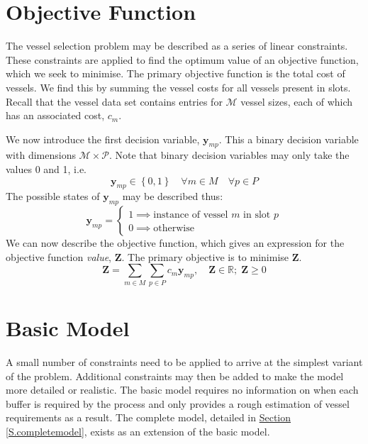 \section{Objective Function}\label{S.objfn}

The vessel selection problem may be described as a series of linear
constraints.
These constraints are applied to find the optimum value of an objective
function, which we seek to minimise.
The primary objective function is the total cost of vessels.
We find this by summing the vessel costs for all vessels present in slots.
Recall that the vessel data set contains entries for $\mathcal{M}$ vessel
sizes, each of which has an associated cost, $c_{m}$.

We now introduce the first decision variable, $\boldsymbol{y}_{mp}$.
This a binary decision variable with dimensions
$\mathcal{M} \times \mathcal{P}$.
Note that binary decision variables may only take the values 0 and 1, i.e.
\begin{equation}
    \boldsymbol{y}_{mp} \in \left\{ 0, 1 \right\} \quad \forall m \in M \quad
    \forall p \in P
    \label{eq.y}
\end{equation}
The possible states of $\boldsymbol{y}_{mp}$ may be described thus:
\begin{equation}
    \boldsymbol{y}_{mp} =
    \begin{cases}
        1 \implies \text{instance of vessel $m$ in slot $p$}\\
        0 \implies \text{otherwise}
    \end{cases}
\end{equation}
We can now describe the objective function, which gives an expression for the
objective function \emph{value}, $\boldsymbol{Z}$.
The primary objective is to minimise $\boldsymbol{Z}$.
\begin{equation}
    \boldsymbol{Z} = \sum_{m \in M} \sum_{p \in P} c_m \boldsymbol{y}_{mp},
    \quad \boldsymbol{Z} \in \mathbb{R}; \; \boldsymbol{Z} \ge 0
    \label{eq.objfn}
\end{equation}

\section{Basic Model}\label{S.basicprob}

A small number of constraints need to be applied to arrive at the simplest
variant of the problem.
Additional constraints may then be added to make the model more detailed or
realistic.
The basic model requires no information on when each buffer is required by the
process and only provides a rough estimation of vessel requirements as a
result.
The complete model, detailed in
\hyperref[S.completemodel]{Section \ref*{S.completemodel}}, exists as an
extension of the basic model.

